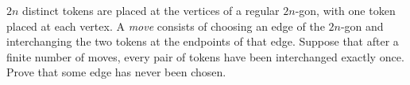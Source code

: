 $2n$ distinct tokens are placed at the vertices of a regular $2n$-gon, with one token placed at each vertex. A \emph{move} consists of choosing an edge of the $2n$-gon and interchanging the two tokens at the endpoints of that edge. Suppose that after a finite number of moves, every pair of tokens have been interchanged exactly once. Prove that some edge has never been chosen.